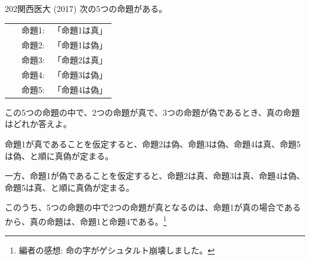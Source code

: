 \begin{prob}{202}{}{関西医大 (2017)}
 次の5つの命題がある。

 \begin{tabular}{cc}
  ~~~命題1: & 「命題1は真」\\
  ~~~命題2: & 「命題1は偽」\\
  ~~~命題3: & 「命題2は真」\\
  ~~~命題4: & 「命題3は偽」\\
  ~~~命題5: & 「命題4は偽」\\
 \end{tabular}

 この5つの命題の中で、2つの命題が真で、3つの命題が偽であるとき、真の命題はどれか答えよ。
\end{prob}
命題1が真であることを仮定すると、命題2は偽、命題3は偽、命題4は真、命題5は偽、と順に真偽が定まる。

一方、命題1が偽であることを仮定すると、命題2は真、命題3は真、命題4は偽、命題5は真、と順に真偽が定まる。

このうち、5つの命題の中で2つの命題が真となるのは、命題1が真の場合であるから、真の命題は、命題1と命題4である。\footnote{編者の感想: 命の字がゲシュタルト崩壊しました。}